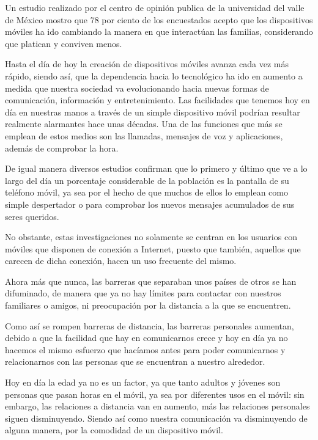 \documentclass[10pt,a4paper]{article}
\begin{document}
Un estudio realizado por el centro de opini{\'o}n publica de la universidad del valle de M{\'e}xico mostro que 78 por ciento de los encuestados acepto que los dispositivos m{\'o}viles ha ido cambiando la manera en que interact{\'u}an las familias, considerando que platican y conviven menos.

Hasta el d{\'i}a de hoy la creaci{\'o}n de dispositivos m{\'o}viles avanza cada vez m{\'a}s r{\'a}pido, siendo as{\'i},  que la dependencia hacia lo tecnol{\'o}gico ha ido en aumento a medida que nuestra sociedad va evolucionando hacia nuevas formas de comunicaci{\'o}n, informaci{\'o}n y entretenimiento.
Las facilidades que tenemos hoy en d{\'i}a en nuestras manos a trav{\'e}s de un simple dispositivo m{\'o}vil podr{\'i}an resultar realmente alarmantes hace unas d{\'e}cadas. Una de las funciones que m{\'a}s se emplean de estos medios son las llamadas, mensajes de voz y aplicaciones, adem{\'a}s de comprobar la hora.

De igual manera diversos estudios confirman que lo primero y {\'u}ltimo que ve a lo largo del d{\'i}a un porcentaje considerable de la poblaci{\'o}n es la pantalla de su tel{\'e}fono m{\'o}vil, ya sea por el hecho de que muchos de ellos lo emplean como simple despertador o para comprobar los nuevos mensajes acumulados de sus seres queridos.

No obstante, estas investigaciones no solamente se centran en los usuarios con m{\'o}viles que disponen de conexi{\'o}n a Internet, puesto que tambi{\'e}n, aquellos que carecen de dicha conexi{\'o}n,  hacen un uso frecuente del mismo.

Ahora m{\'a}s que nunca, las barreras que separaban unos pa{\'i}ses de otros se han difuminado, de manera que ya no hay l{\'i}mites para contactar con nuestros familiares o amigos, ni preocupaci{\'o}n por la distancia a la que se encuentren. 

Como as{\'i} se rompen barreras de distancia, las barreras personales aumentan, debido a que la facilidad que hay en comunicarnos crece y hoy en d{\'i}a ya no hacemos el mismo esfuerzo que hac{\'i}amos antes para poder comunicarnos y relacionarnos con las personas que se encuentran a nuestro alrededor.

Hoy en d{\'i}a la edad ya no es un factor, ya que tanto adultos y j{\'o}venes son personas que pasan horas en el m{\'o}vil, ya sea por diferentes usos en el m{\'o}vil: sin embargo, las relaciones a distancia van en aumento, m{\'a}s las relaciones personales siguen disminuyendo. 
Siendo as{\'i} como nuestra comunicaci{\'o}n va disminuyendo de alguna manera, por la comodidad de un dispositivo m{\'o}vil.
\end{document}

